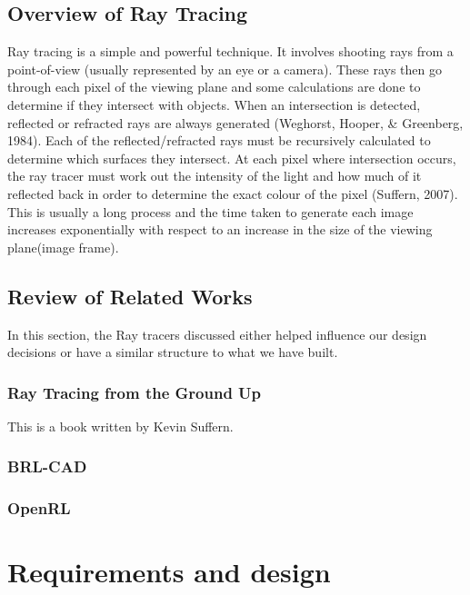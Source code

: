 \documentclass[a4paper]{article}
\begin{document}
	\subsection{Overview of Ray Tracing}
	\par Ray tracing is a simple and powerful technique. It involves shooting rays from a point-of-view (usually represented by an eye or a camera). These rays then go through each pixel of the viewing plane and some calculations are done to determine if they intersect with objects. When an intersection is detected, reflected or refracted rays are always generated (Weghorst, Hooper, \& Greenberg, 1984). Each of the reflected/refracted rays must be recursively calculated to determine which surfaces they intersect. At each pixel where intersection occurs, the ray tracer must work out the intensity of the light and how much of it reflected back in order to determine the exact colour of the pixel (Suffern, 2007). This is usually a long process and the time taken to generate each image increases exponentially with respect to an increase in the size of the viewing plane(image frame).\\
	
	\subsection{Review of Related Works}
	\par In this section, the Ray tracers discussed either helped influence our design decisions or have a similar structure to what we have built.
	\subsubsection{Ray Tracing from the Ground Up}
	\par This is a book written by Kevin Suffern.
	
	\subsubsection{BRL-CAD}
	\subsubsection{OpenRL}
	
	\section{Requirements and design}
	
\end{document}
